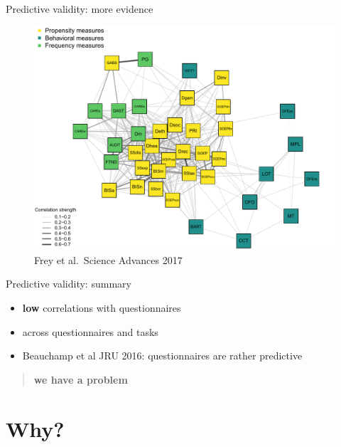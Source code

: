 \documentclass[
  ignorenonframetext,
]{beamer}
\begin{document}
\begin{frame}{Predictive validity: more evidence}
\protect\hypertarget{predictive-validity-more-evidence}{}

\begin{figure}
\centering
\includegraphics[width=7.29167in,height=\textheight]{frey.png}
\caption{Frey et al.~Science Advances 2017}
\end{figure}

\end{frame}

\begin{frame}{Predictive validity: summary}
\protect\hypertarget{predictive-validity-summary}{}

\begin{itemize}
\item
  \textbf{low} correlations with questionnaires
\item
  across questionnaires and tasks
\item
  Beauchamp et al JRU 2016: questionnaires are rather predictive
\end{itemize}

\begin{quote}
\textbf{we have a problem}
\end{quote}

\end{frame}

\hypertarget{why}{%
\section{Why?}\label{why}}
\end{document}
